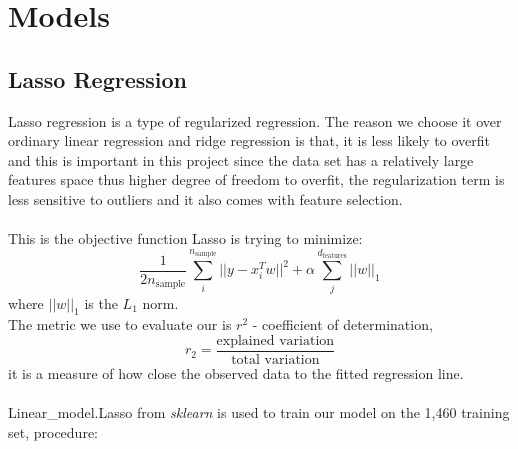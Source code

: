 \documentclass[12pt]{article}
\begin{document}
\section{Models}
\subsection{Lasso Regression}
Lasso regression is a type of regularized regression. The reason we choose it over ordinary linear regression and ridge regression is that, it is less likely to overfit and this is important in this project since the data set has a relatively large features space thus higher degree of freedom to overfit, the regularization term is less sensitive to outliers and it also comes with feature selection.\\
\\
This is the objective function Lasso is trying to minimize:
\begin{equation*}
\frac{1}{2n_{\text{sample}}}\sum_{i}^{n_{\text{sample}}}||y-x_i^Tw||^2 + \alpha\sum_{j}^{d_{\text{features}}}||w||_1
\end{equation*}
where $||w||_1$ is the $L_1$ norm.\\
The metric we use to evaluate our is $r^2$ - coefficient of determination,
\begin{equation*}
r_2=\frac{\text{explained variation}}{\text{total variation}}
\end{equation*}
it is a measure of how close the observed data to the fitted regression line. \\
\\
Linear\_model.Lasso\cite{lasso} from \textit{sklearn} is used to train our model on the 1,460 training set, procedure:
\end{document}
